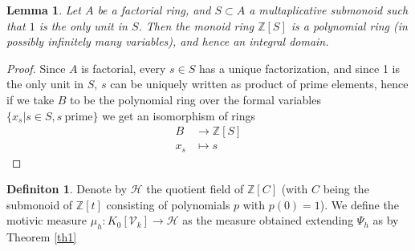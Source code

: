 \documentclass[11pt, a4paper, german]{article}
\theoremstyle{plain}
\newtheorem{lemma}[theorem]{Lemma}
\theoremstyle{definition}
\newtheorem{definition}[theorem]{Definiton}
\newcommand{\gring}[1][k]{K_0[\mathcal{V}_#1]}
\begin{document}
\begin{lemma}
    Let $A$ be a factorial ring, and $S \subset A$ a multaplicative submonoid such that $1$ is the only unit in $S$. Then the monoid ring
    $\mathbb{Z}[S]$ is a polynomial ring (in possibly infinitely many variables), and hence an integral domain.
\end{lemma}
\begin{proof}
    Since $A$ is factorial, every $s \in S$ has a unique factorization, and since 1 is the only unit in $S$, 
    $s$ can be uniquely written as product of prime elements, hence if we take $B$ to be the polynomial ring over the formal
    variables $\{x_s | s \in S, s\ \text{prime}\}$ we get an isomorphism of rings
    \begin{align*}
        B &\to \mathbb{Z}[S] \\
        x_s &\mapsto s
    \end{align*}
\end{proof}

\begin{definition}
    Denote by $\mathcal{H}$ the quotient field of $\mathbb{Z}[C]$ (with $C$ being the submonoid of $\mathbb{Z}[t]$ consisting of polynomials 
    $p$ with $p(0) = 1$).
    We define the motivic measure $\mu_h \colon \gring \to \mathcal{H}$ as the measure obtained extending $\Psi_h$ as by Theorem \ref{th1}
\end{definition}
\end{document}
